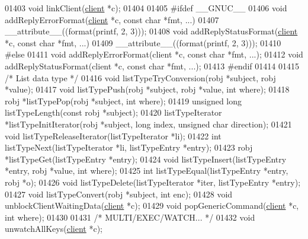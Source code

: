 \begin{DoxyCode}
{{{{{{{01403 \textcolor{keywordtype}{void} linkClient(\hyperlink{structclient}{client} *c);
01404 
01405 \textcolor{preprocessor}{#}\textcolor{preprocessor}{ifdef} \_\_GNUC\_\_
01406 \textcolor{keywordtype}{void} addReplyErrorFormat(\hyperlink{structclient}{client} *c, \textcolor{keyword}{const} \textcolor{keywordtype}{char} *fmt, ...)
01407     \textcolor{keyword}{\_\_attribute\_\_}((format(printf, 2, 3)));
01408 \textcolor{keywordtype}{void} addReplyStatusFormat(\hyperlink{structclient}{client} *c, \textcolor{keyword}{const} \textcolor{keywordtype}{char} *fmt, ...)
01409     \textcolor{keyword}{\_\_attribute\_\_}((format(printf, 2, 3)));
01410 \textcolor{preprocessor}{#}\textcolor{preprocessor}{else}
01411 \textcolor{keywordtype}{void} addReplyErrorFormat(client *c, \textcolor{keyword}{const} \textcolor{keywordtype}{char} *fmt, ...);
01412 \textcolor{keywordtype}{void} addReplyStatusFormat(client *c, \textcolor{keyword}{const} \textcolor{keywordtype}{char} *fmt, ...);
01413 \textcolor{preprocessor}{#}\textcolor{preprocessor}{endif}
01414 
01415 \textcolor{comment}{/* List data type */}
01416 \textcolor{keywordtype}{void} listTypeTryConversion(robj *subject, robj *value);
01417 \textcolor{keywordtype}{void} listTypePush(robj *subject, robj *value, \textcolor{keywordtype}{int} where);
01418 robj *listTypePop(robj *subject, \textcolor{keywordtype}{int} where);
01419 \textcolor{keywordtype}{unsigned} \textcolor{keywordtype}{long} listTypeLength(\textcolor{keyword}{const} robj *subject);
01420 listTypeIterator *listTypeInitIterator(robj *subject, \textcolor{keywordtype}{long} index, \textcolor{keywordtype}{unsigned} \textcolor{keywordtype}{char} direction);
01421 \textcolor{keywordtype}{void} listTypeReleaseIterator(listTypeIterator *li);
01422 \textcolor{keywordtype}{int} listTypeNext(listTypeIterator *li, listTypeEntry *entry);
01423 robj *listTypeGet(listTypeEntry *entry);
01424 \textcolor{keywordtype}{void} listTypeInsert(listTypeEntry *entry, robj *value, \textcolor{keywordtype}{int} where);
01425 \textcolor{keywordtype}{int} listTypeEqual(listTypeEntry *entry, robj *o);
01426 \textcolor{keywordtype}{void} listTypeDelete(listTypeIterator *iter, listTypeEntry *entry);
01427 \textcolor{keywordtype}{void} listTypeConvert(robj *subject, \textcolor{keywordtype}{int} enc);
01428 \textcolor{keywordtype}{void} unblockClientWaitingData(\hyperlink{structclient}{client} *c);
01429 \textcolor{keywordtype}{void} popGenericCommand(\hyperlink{structclient}{client} *c, \textcolor{keywordtype}{int} where);
01430 
01431 \textcolor{comment}{/* MULTI/EXEC/WATCH... */}
01432 \textcolor{keywordtype}{void} unwatchAllKeys(\hyperlink{structclient}{client} *c);
}}}}}}}
\end{DoxyCode}
